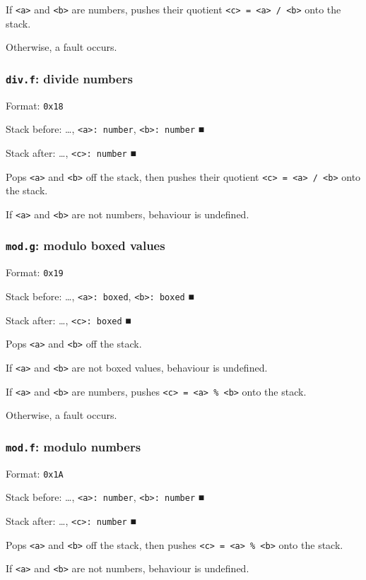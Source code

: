 \documentclass[11pt]{article}
\begin{document}
If \texttt{<a>} and \texttt{<b>} are numbers, pushes their quotient \texttt{<c> = <a> / <b>}
onto the stack.

Otherwise, a fault occurs.

\subsubsection{\texttt{div.f}: divide numbers}
\label{sec:org9ea386e}
Format: \texttt{0x18}

Stack before: \ldots{}​, \texttt{<a>: number}, \texttt{<b>: number} ■

Stack after: \ldots{}​, \texttt{<c>: number} ■

Pops \texttt{<a>} and \texttt{<b>} off the stack, then pushes their quotient
\texttt{<c> = <a> / <b>} onto the stack.

If \texttt{<a>} and \texttt{<b>} are not numbers, behaviour is undefined.

\subsubsection{\texttt{mod.g}: modulo boxed values}
\label{sec:org6afbbf6}
Format: \texttt{0x19}

Stack before: \ldots{}​, \texttt{<a>: boxed}, \texttt{<b>: boxed} ■

Stack after: \ldots{}​, \texttt{<c>: boxed} ■

Pops \texttt{<a>} and \texttt{<b>} off the stack.

If \texttt{<a>} and \texttt{<b>} are not boxed values, behaviour is undefined.

If \texttt{<a>} and \texttt{<b>} are numbers, pushes \texttt{<c> = <a> \% <b>} onto the stack.

Otherwise, a fault occurs.

\subsubsection{\texttt{mod.f}: modulo numbers}
\label{sec:orgf4bf035}
Format: \texttt{0x1A}

Stack before: \ldots{}​, \texttt{<a>: number}, \texttt{<b>: number} ■

Stack after: \ldots{}​, \texttt{<c>: number} ■

Pops \texttt{<a>} and \texttt{<b>} off the stack, then pushes \texttt{<c> = <a> \% <b>} onto
the stack.

If \texttt{<a>} and \texttt{<b>} are not numbers, behaviour is undefined.
\end{document}
